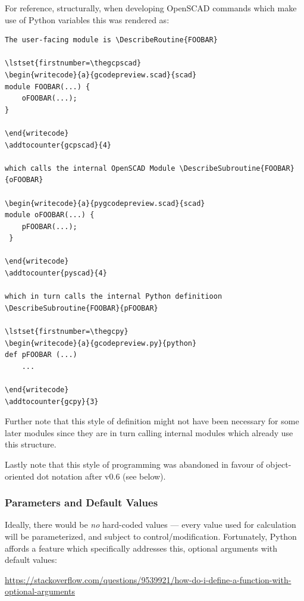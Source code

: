 \documentclass{ltxdoc}
\begin{document}
For reference, structurally, when developing OpenSCAD commands which make use of Python variables this was rendered as:

\begin{verbatim}
The user-facing module is \DescribeRoutine{FOOBAR}

\lstset{firstnumber=\thegcpscad}
\begin{writecode}{a}{gcodepreview.scad}{scad}
module FOOBAR(...) {
    oFOOBAR(...);
}

\end{writecode}
\addtocounter{gcpscad}{4}
 
which calls the internal OpenSCAD Module \DescribeSubroutine{FOOBAR}{oFOOBAR}

\begin{writecode}{a}{pygcodepreview.scad}{scad}
module oFOOBAR(...) {
    pFOOBAR(...);
 }
 
\end{writecode}
\addtocounter{pyscad}{4}

which in turn calls the internal Python definitioon \DescribeSubroutine{FOOBAR}{pFOOBAR}

\lstset{firstnumber=\thegcpy}
\begin{writecode}{a}{gcodepreview.py}{python}
def pFOOBAR (...)
    ...
    
\end{writecode}
\addtocounter{gcpy}{3}
\end{verbatim}

Further note that this style of definition might not have been necessary for some later modules since they are in turn calling internal modules which already use this structure.

Lastly note that this style of programming was abandoned in favour of object-oriented dot notation after v0.6 (see below).

\subsubsection{Parameters and Default Values}

Ideally, there would be \emph{no} hard-coded values --- every value used for calculation will be parameterized, and subject to control/modification. Fortunately, Python affords a feature which specifically addresses this, optional arguments with default values:

\noindent\url{https://stackoverflow.com/questions/9539921/how-do-i-define-a-function-with-optional-arguments}
\end{document}
